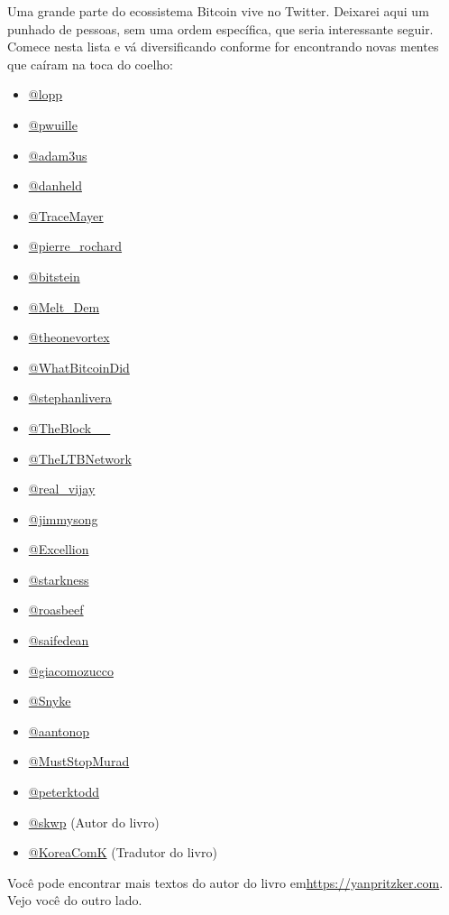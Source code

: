 Uma grande parte do ecossistema Bitcoin vive no Twitter. Deixarei aqui um punhado de pessoas, sem uma ordem específica, que seria interessante seguir. Comece nesta lista e vá diversificando conforme for encontrando novas mentes que caíram na toca do coelho:

\begin{itemize}
\item \href{https://twitter.com/lopp}{@lopp}
\item \href{https://twitter.com/pwuille}{@pwuille}
\item \href{https://twitter.com/adam3us}{@adam3us}
\item \href{https://twitter.com/danheld}{@danheld}
\item \href{https://twitter.com/TraceMayer}{@TraceMayer}
\item \href{https://twitter.com/pierre_rochard}{@pierre\_rochard}
\item \href{https://twitter.com/bitstein}{@bitstein}
\item \href{https://twitter.com/Melt_Dem}{@Melt\_Dem}
\item \href{https://twitter.com/theonevortex}{@theonevortex}
\item \href{https://twitter.com/WhatBitcoinDid}{@WhatBitcoinDid}
\item \href{https://twitter.com/stephanlivera}{@stephanlivera}
\item \href{https://twitter.com/TheBlock__}{@TheBlock\_\_}
\item \href{https://twitter.com/TheLTBNetwork}{@TheLTBNetwork}
\item \href{https://twitter.com/real_vijay}{@real\_vijay}
\item \href{https://twitter.com/jimmysong}{@jimmysong}
\item \href{https://twitter.com/Excellion}{@Excellion}
\item \href{https://twitter.com/starkness}{@starkness}
\item \href{https://twitter.com/roasbeef}{@roasbeef}
\item \href{https://twitter.com/saifedean}{@saifedean}
\item \href{https://twitter.com/giacomozucco}{@giacomozucco}
\item \href{https://twitter.com/Snyke}{@Snyke}
\item \href{https://twitter.com/aantonop}{@aantonop}
\item \href{https://twitter.com/MustStopMurad}{@MustStopMurad}
\item \href{https://twitter.com/peterktodd}{@peterktodd}
\item \href{https://twitter.com/skwp}{@skwp} (Autor do livro)
\item \href{https://twitter.com/KoreaComK}{@KoreaComK} (Tradutor do livro)
\end{itemize}

Você pode encontrar mais textos do autor do livro em\newline \url{https://yanpritzker.com}. Vejo você do outro lado.